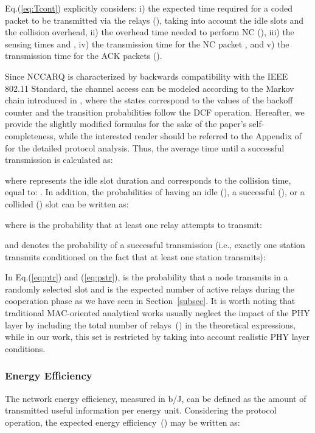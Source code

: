 \documentclass[12pt,draftcls, onecolumn]{IEEEtran}
\begin{document}
Eq.(\ref{eq:Tcont}) explicitly considers: i) the expected time required for a coded packet to be transmitted via the relays (), taking into account the idle slots and the collision overhead, ii) the overhead time needed to perform NC (), iii) the sensing times  and , iv) the transmission time for the NC packet , and v) the transmission time for the ACK packets ().

Since NCCARQ is characterized by backwards compatibility with the IEEE 802.11 Standard, the channel access can be modeled according to the Markov chain introduced in \cite{bianchi}, where the states correspond to the values of the backoff counter and the transition probabilities follow the DCF operation. Hereafter, we provide the slightly modified formulas for the sake of the paper's self-completeness, while the interested reader should be referred to the Appendix of \cite{nccarq} for the detailed protocol analysis. Thus, the average time until a successful transmission is calculated as:


where  represents the idle slot duration and  corresponds to the collision time, equal to: . In addition, the probabilities of having an idle (), a successful (), or a collided () slot can be written as:




where  is the probability that at least one relay attempts to transmit:

and  denotes the probability of a successful transmission (i.e., exactly one station transmits conditioned on the fact that at least one station transmits):


In Eq.(\ref{eq:ptr}) and (\ref{eq:pstr}),  is the probability that a node transmits in a randomly selected slot and  is the expected number of active relays during the cooperation phase as we have seen in Section~\ref{subsec}. It is worth noting that traditional MAC-oriented analytical works usually neglect the impact of the PHY layer by including the total number of relays~() in the theoretical expressions, while in our work, this set is restricted by taking into account realistic PHY layer conditions.

\subsubsection{Energy Efficiency}
\label{sec:energy}

The network energy efficiency, measured in b/J, can be defined as the amount of transmitted useful information per energy unit. Considering the protocol operation, the expected energy efficiency~() may be written as:
\end{document}
